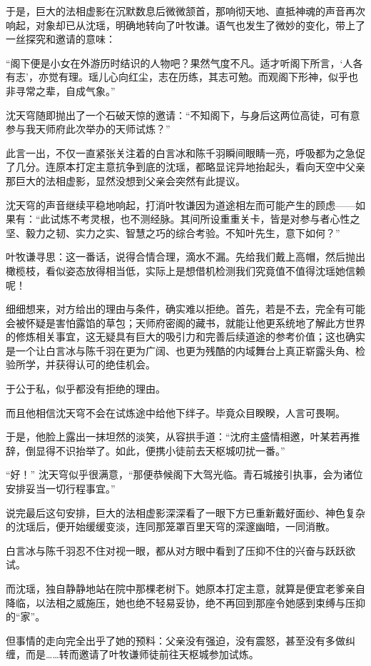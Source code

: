 于是，巨大的法相虚影在沉默数息后微微颔首，那响彻天地、直抵神魂的声音再次响起，对象却已从沈瑶，明确地转向了叶牧谦。语气也发生了微妙的变化，带上了一丝探究和邀请的意味：

“阁下便是小女在外游历时结识的人物吧？果然气度不凡。适才听阁下所言，‘人各有志’，亦觉有理。瑶儿心向红尘，志在历练，其志可勉。而观阁下形神，似乎也非寻常之辈，自成气象。”

沈天穹随即抛出了一个石破天惊的邀请：“不知阁下，与身后这两位高徒，可有意参与我天师府此次举办的天师试炼？”

此言一出，不仅一直紧张关注着的白言冰和陈千羽瞬间眼睛一亮，呼吸都为之急促了几分。连原本打定主意抗争到底的沈瑶，都略显诧异地抬起头，看向天空中父亲那巨大的法相虚影，显然没想到父亲会突然有此提议。

沈天穹的声音继续平稳地响起，打消叶牧谦因为道途相左而可能产生的顾虑——如果有：“此试炼不考灵根，也不测经脉。其间所设重重关卡，皆是对参与者心性之坚、毅力之韧、实力之实、智慧之巧的综合考验。不知叶先生，意下如何？”

叶牧谦寻思：这一番话，说得合情合理，滴水不漏。先给我们戴上高帽，然后抛出橄榄枝，看似姿态放得相当低，实际上是想借机检测我们究竟值不值得沈瑶她信赖呢！

细细想来，对方给出的理由与条件，确实难以拒绝。首先，若是不去，完全有可能会被怀疑是害怕露馅的草包；天师府密阁的藏书，就能让他更系统地了解此方世界的修炼相关事宜，这无疑具有巨大的吸引力和完善后续道途的参考价值；这也确实是一个让白言冰与陈千羽在更为广阔、也更为残酷的内域舞台上真正崭露头角、检验所学，并获得认可的绝佳机会。

于公于私，似乎都没有拒绝的理由。

而且他相信沈天穹不会在试炼途中给他下绊子。毕竟众目睽睽，人言可畏啊。

于是，他脸上露出一抹坦然的淡笑，从容拱手道：“沈府主盛情相邀，叶某若再推辞，倒显得不识抬举了。如此，便携小徒前去天枢城叨扰一番。”

“好！” 沈天穹似乎很满意，“那便恭候阁下大驾光临。青石城接引执事，会为诸位安排妥当一切行程事宜。”

说完最后这句安排，巨大的法相虚影深深看了一眼下方已重新戴好面纱、神色复杂的沈瑶后，便开始缓缓变淡，连同那笼罩百里天穹的深邃幽暗，一同消散。

白言冰与陈千羽忍不住对视一眼，都从对方眼中看到了压抑不住的兴奋与跃跃欲试。

而沈瑶，独自静静地站在院中那棵老树下。她原本打定主意，就算是便宜老爹亲自降临，以法相之威施压，她也绝不轻易妥协，绝不再回到那座令她感到束缚与压抑的“家”。

但事情的走向完全出乎了她的预料：父亲没有强迫，没有震怒，甚至没有多做纠缠，而是……转而邀请了叶牧谦师徒前往天枢城参加试炼。

